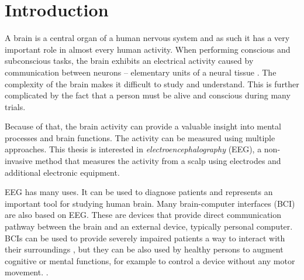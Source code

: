

\glsunsetall

\chapter{Introduction}
A brain is a central organ of a human nervous system and as such it has a very
important role in almost every human activity. When performing conscious and subconscious tasks, the brain exhibits an electrical activity caused by communication between neurons -- elementary units of a neural tissue \cite{brainFacts}. The complexity of the brain makes it difficult to study and understand. This is further complicated by the fact that a person must be alive and conscious during many trials.

Because of that, the brain activity can provide a valuable insight into mental processes and brain functions. The activity can be measured using multiple approaches. This thesis is interested in \emph{electroencephalography} (EEG), a non-invasive method that measures the activity from a scalp using electrodes and additional electronic equipment. 

EEG has many uses. It can be used to diagnose patients and represents an important tool for studying human brain. Many brain-computer interfaces (BCI) are also based on EEG. These are devices that provide direct communication pathway between the brain and an external device, typically personal computer. BCIs can be used to provide severely impaired patients a way to interact with their surroundings \cite{bcComm}, but they can be also used by healthy persons to augment cognitive or mental functions, for example to control a device without any motor movement. \cite{compForBrainStudy}. 

